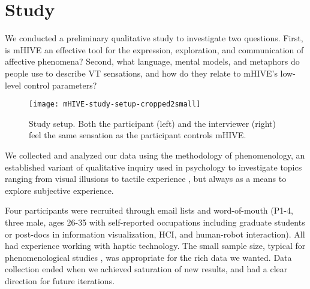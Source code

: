 
%
% 
\section{Study}

We conducted a preliminary qualitative study to investigate two questions.
First, is mHIVE an effective tool for the expression, exploration, and communication of affective phenomena?
Second, what language, mental models, and metaphors do people use to describe VT sensations, and how do they relate to mHIVE's low-level control parameters?

\begin{figure}[tb]
	\centering
	   \texttt{[image: mHIVE-study-setup-cropped2small]} 
	   \caption{
	   Study setup. Both the participant (left) and the interviewer (right) feel the same sensation as the participant controls mHIVE.
}
	   \label{fig:StudySetup}
\end{figure}

We collected and analyzed our data using the methodology of phenomenology, 
an established variant of qualitative inquiry used in psychology to investigate topics ranging from visual illusions to tactile experience \cite{Richer1978, Obrist2013, Creswell2013}, but always as a means to explore subjective experience.

Four participants were recruited through email lists and word-of-mouth (P1-4, three male, ages 26-35 with self-reported occupations including graduate students or post-docs in information visualization, HCI, and human-robot interaction).
All had experience working with haptic technology.
The small sample size, typical for phenomenological studies \cite{Creswell2013}, was appropriate for the rich data we wanted.
Data collection ended when we achieved saturation of new results, and had a clear direction for future iterations.


